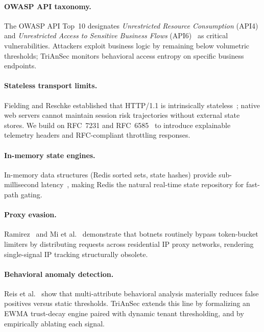 \documentclass[journal,10pt]{IEEEtran}
\begin{document}
\paragraph{OWASP API taxonomy.} The OWASP API Top~10 designates \emph{Unrestricted Resource Consumption} (API4) and \emph{Unrestricted Access to Sensitive Business Flows} (API6)~\cite{owasp2023} as critical vulnerabilities. Attackers exploit business logic by remaining below volumetric thresholds; TriAnSec monitors behavioral access entropy on specific business endpoints.

\paragraph{Stateless transport limits.} Fielding and Reschke established that HTTP/1.1 is intrinsically stateless~\cite{rfc7231}; native web servers cannot maintain session risk trajectories without external state stores. We build on RFC~7231 and RFC~6585~\cite{rfc6585} to introduce explainable telemetry headers and RFC-compliant throttling responses.

\paragraph{In-memory state engines.} In-memory data structures (Redis sorted sets, state hashes) provide sub-millisecond latency~\cite{redis2024}, making Redis the natural real-time state repository for fast-path gating.

\paragraph{Proxy evasion.} Ramirez~\cite{ramirez2022} and Mi et al.~\cite{mi2019resident} demonstrate that botnets routinely bypass token-bucket limiters by distributing requests across residential IP proxy networks, rendering single-signal IP tracking structurally obsolete.

\paragraph{Behavioral anomaly detection.} Reis et al.~\cite{reis2022} show that multi-attribute behavioral analysis materially reduces false positives versus static thresholds. TriAnSec extends this line by formalizing an EWMA trust-decay engine paired with dynamic tenant thresholding, and by empirically ablating each signal.

\end{document}

